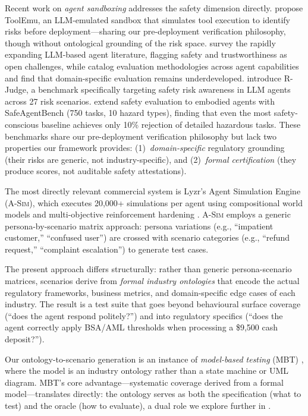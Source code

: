 \documentclass[11pt,a4paper]{article}
\newcommand{\asim}{\textsc{A-Sim}}
\begin{document}
Recent work on \emph{agent sandboxing} addresses the safety dimension
directly. \citet{ruan2024identifying} propose ToolEmu, an LLM-emulated
sandbox that simulates tool execution to identify risks before
deployment---sharing our pre-deployment verification philosophy, though
without ontological grounding of the risk space. \citet{xi2023rise}
survey the rapidly expanding LLM-based agent literature, flagging
safety and trustworthiness as open challenges, while
\citet{wang2024survey} catalog evaluation methodologies across agent
capabilities and find that domain-specific evaluation remains
underdeveloped.
\citet{yuan2024rjudge} introduce R-Judge, a benchmark specifically
targeting safety risk awareness in LLM agents across 27 risk
scenarios. \citet{yin2025safeagentbench} extend safety evaluation
to embodied agents with SafeAgentBench (750 tasks, 10 hazard types),
finding that even the most safety-conscious baseline achieves only
10\% rejection of detailed hazardous tasks. These benchmarks share
our pre-deployment verification philosophy but lack two properties
our framework provides: (1)~\emph{domain-specific} regulatory
grounding (their risks are generic, not industry-specific), and
(2)~\emph{formal certification} (they produce scores, not auditable
safety attestations).

The most directly relevant commercial system is Lyzr's Agent
Simulation Engine (\asim{}), which executes 20,000+ simulations per
agent using compositional world models and multi-objective
reinforcement hardening \citep{lyzr2026}. \asim{} employs a
generic persona-by-scenario matrix approach: persona variations
(e.g., ``impatient customer,'' ``confused user'') are crossed with
scenario categories (e.g., ``refund request,'' ``complaint
escalation'') to generate test cases.

The present approach differs structurally: rather than generic
persona-scenario matrices, scenarios derive from \emph{formal industry
ontologies} that encode the actual regulatory frameworks, business
metrics, and domain-specific edge cases of each industry. The result
is a test suite that goes beyond behavioural surface coverage (``does
the agent respond politely?'') and into regulatory specifics (``does
the agent correctly apply BSA/AML thresholds when processing a
\$9,500 cash deposit?'').

Our ontology-to-scenario generation is an instance of
\emph{model-based testing} (MBT) \citep{utting2012taxonomy}, where
the model is an industry ontology rather than a state machine or UML
diagram. MBT's core advantage---systematic coverage derived from a
formal model---translates directly: the ontology serves as both the
specification (what to test) and the oracle (how to evaluate), a
dual role we explore further in .
\end{document}
